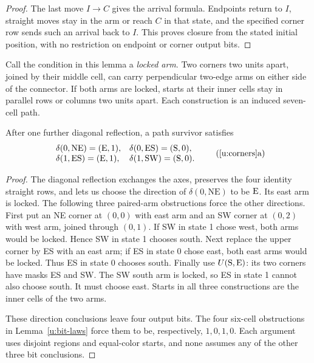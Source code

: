 \begin{proof}
The last move $I\to C$ gives the arrival formula. Endpoints return
to $I$, straight moves stay in the arm or reach $C$ in that state,
and the specified corner row sends such an arrival back to $I$.
This proves closure from the stated initial position, with no
restriction on endpoint or corner output bits.
\end{proof}

Call the condition in this lemma a \emph{locked arm}. Two corners
two units apart, joined by their middle cell, can carry perpendicular
two-edge arms on either side of the connector. If both arms are locked,
starts at their inner cells stay in parallel rows or columns two
units apart. Each construction is an induced seven-cell path.

\begin{lemma}\label{u:corners}
After one further diagonal reflection, a path survivor satisfies
\[
\begin{array}{ll}
\delta(0,\mathrm{NE})=(\E,1),&
\delta(0,\mathrm{ES})=(\Sdir,0),\\
\delta(1,\mathrm{ES})=(\E,1),&
\delta(1,\mathrm{SW})=(\Sdir,0).
\end{array}\tag{\ref{u:corners}a}
\]
\end{lemma}

\begin{proof}
The diagonal reflection exchanges the axes, preserves the four
identity straight rows, and lets us choose the direction of
$\delta(0,\mathrm{NE})$ to be $\mathrm{E}$. Its east arm is locked.
The following three paired-arm obstructions force the other directions.
First put an NE corner at $(0,0)$ with east arm and an SW corner at
$(0,2)$ with west arm, joined through $(0,1)$. If SW in state 1
chose west, both arms would be locked. Hence SW in state 1 chooses
south. Next replace the upper corner by ES with an east arm; if ES
in state 0 chose east, both east arms would be locked. Thus ES in
state 0 chooses south. Finally use $U(\mathrm{S},\mathrm{E})$: its two corners
have masks ES and SW. The SW south arm is locked, so ES in state 1
cannot also choose south. It must choose east. Starts in all three
constructions are the inner cells of the two arms.

These direction conclusions leave four output bits. The four
six-cell obstructions in Lemma~\ref{u:bit-laws} force them to be,
respectively, $1,0,1,0$. Each argument uses disjoint regions and
equal-color starts, and none assumes any of the other three bit
conclusions.
\end{proof}

